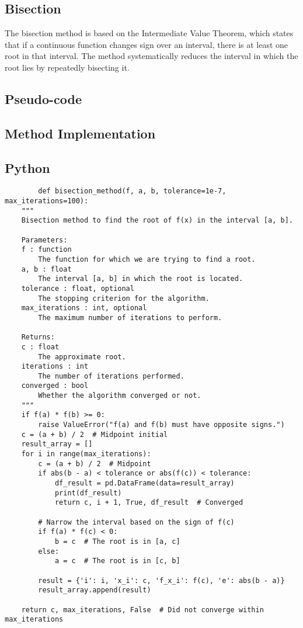 \documentclass{article}
\begin{document}
    \subsection{Bisection}\label{subsec:bisection}

    The bisection method is based on the Intermediate Value Theorem, which states that if a continuous function changes
    sign over an interval, there is at least one root in that interval. The method systematically reduces the interval
    in which the root lies by repeatedly bisecting it.

    \subsection{Pseudo-code}

    \subsection{Method Implementation}
    \subsection{Python}

    \begin{verbatim}
        def bisection_method(f, a, b, tolerance=1e-7, max_iterations=100):
    """
    Bisection method to find the root of f(x) in the interval [a, b].

    Parameters:
    f : function
        The function for which we are trying to find a root.
    a, b : float
        The interval [a, b] in which the root is located.
    tolerance : float, optional
        The stopping criterion for the algorithm.
    max_iterations : int, optional
        The maximum number of iterations to perform.

    Returns:
    c : float
        The approximate root.
    iterations : int
        The number of iterations performed.
    converged : bool
        Whether the algorithm converged or not.
    """
    if f(a) * f(b) >= 0:
        raise ValueError("f(a) and f(b) must have opposite signs.")
    c = (a + b) / 2  # Midpoint initial
    result_array = []
    for i in range(max_iterations):
        c = (a + b) / 2  # Midpoint
        if abs(b - a) < tolerance or abs(f(c)) < tolerance:
            df_result = pd.DataFrame(data=result_array)
            print(df_result)
            return c, i + 1, True, df_result  # Converged

        # Narrow the interval based on the sign of f(c)
        if f(a) * f(c) < 0:
            b = c  # The root is in [a, c]
        else:
            a = c  # The root is in [c, b]

        result = {'i': i, 'x_i': c, 'f_x_i': f(c), 'e': abs(b - a)}
        result_array.append(result)

    return c, max_iterations, False  # Did not converge within max_iterations

    \end{verbatim}
\end{document}
